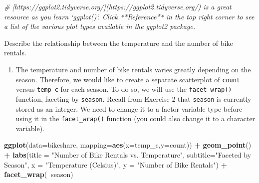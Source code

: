 \documentclass[]{book}
\newenvironment{Shaded}{\begin{snugshade}}{\end{snugshade}}
\newcommand{\KeywordTok}[1]{\textcolor[rgb]{0.13,0.29,0.53}{\textbf{#1}}}
\newcommand{\DataTypeTok}[1]{\textcolor[rgb]{0.13,0.29,0.53}{#1}}
\newcommand{\StringTok}[1]{\textcolor[rgb]{0.31,0.60,0.02}{#1}}
\newcommand{\CommentTok}[1]{\textcolor[rgb]{0.56,0.35,0.01}{\textit{#1}}}
\newcommand{\OperatorTok}[1]{\textcolor[rgb]{0.81,0.36,0.00}{\textbf{#1}}}
\newcommand{\NormalTok}[1]{#1}
\providecommand{\tightlist}{%
  \setlength{\itemsep}{0pt}\setlength{\parskip}{0pt}}
\begin{document}
\begin{Shaded}
\begin{Highlighting}[]
\CommentTok{# [https://ggplot2.tidyverse.org/](https://ggplot2.tidyverse.org/) is a great resource as you learn `ggplot()`. Click **Reference** in the top right corner to see a list of the various plot types available in the ggplot2 package.}
\end{Highlighting}
\end{Shaded}

Describe the relationship between the temperature and the number of bike
rentals.

\begin{enumerate}
\def\labelenumi{\arabic{enumi}.}
\setcounter{enumi}{7}
\tightlist
\item
  The temperature and number of bike rentals varies greatly depending on
  the season. Therefore, we would like to create a separate scatterplot
  of \texttt{count} versus \texttt{temp\_c} for each season. To do so,
  we will use the \texttt{facet\_wrap()} function, faceting by
  \texttt{season}. Recall from Exercise 2 that \texttt{season} is
  currently stored as an integer. We need to change it to a factor
  variable type before using it in the \texttt{facet\_wrap()} function
  (you could also change it to a character variable).
\end{enumerate}

\begin{Shaded}
\end{Shaded}

\begin{Shaded}
\begin{Highlighting}[]
\KeywordTok{ggplot}\NormalTok{(}\DataTypeTok{data=}\NormalTok{bikeshare, }\DataTypeTok{mapping=}\KeywordTok{aes}\NormalTok{(}\DataTypeTok{x=}\NormalTok{temp_c,}\DataTypeTok{y=}\NormalTok{count)) }\OperatorTok{+}\StringTok{ }
\StringTok{  }\KeywordTok{geom_point}\NormalTok{() }\OperatorTok{+}
\StringTok{  }\KeywordTok{labs}\NormalTok{(}\DataTypeTok{title =} \StringTok{"Number of Bike Rentals vs. Temperature"}\NormalTok{, }
       \DataTypeTok{subtitle=}\StringTok{"Faceted by Season"}\NormalTok{, }
       \DataTypeTok{x =} \StringTok{"Temperature (Celsius)"}\NormalTok{, }
       \DataTypeTok{y =} \StringTok{"Number of Bike Rentals"}\NormalTok{) }\OperatorTok{+}
\StringTok{  }\KeywordTok{facet_wrap}\NormalTok{(}\OperatorTok{~}\NormalTok{season)}
\end{Highlighting}
\end{Shaded}
\end{document}
